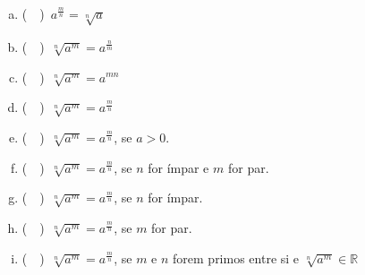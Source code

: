\documentclass[a4paper,14pt]{article}
\begin{document}
\begin{multicols}{2}
\begin{enumerate}
\begin{enumerate}[a)]
        	\item (~~)~$a^\frac{m}{n} = \sqrt[n]{a}$
        	\item (~~)~$\sqrt[n]{a^m} = a^\frac{n}{m}$
        	\item (~~)~$\sqrt[n]{a^m} = a^{mn}$
        	\item (~~)~$\sqrt[n]{a^m} = a^\frac{m}{n}$
        	\item (~~)~$\sqrt[n]{a^m} = a^\frac{m}{n}$, se $a > 0$.
        	\item (~~)~$\sqrt[n]{a^m} = a^\frac{m}{n}$, se $n$ for ímpar e $m$ for par.
        	\item (~~)~$\sqrt[n]{a^m} = a^\frac{m}{n}$, se $n$ for ímpar.
        	\item (~~)~$\sqrt[n]{a^m} = a^\frac{m}{n}$, se $m$ for par.
        	\item (~~)~$\sqrt[n]{a^m} = a^\frac{m}{n}$, se $m$ e $n$ forem primos entre si e $\sqrt[n]{a^m} \in \mathbb{R}$
        \end{enumerate}
    \end{enumerate}        
    \end{multicols}    
\end{document}
